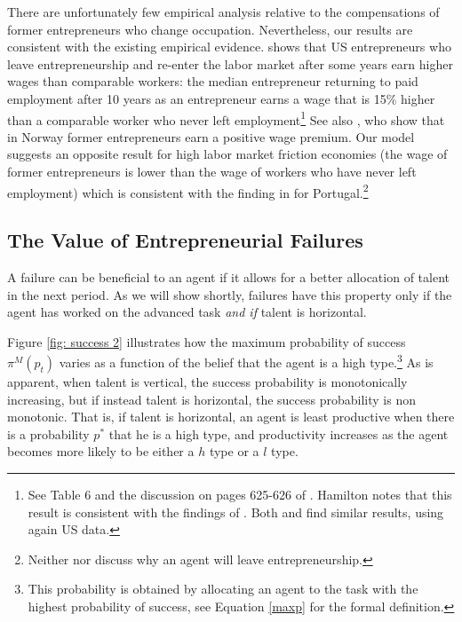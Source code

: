 \documentclass[12pt,american]{paper}
\theoremstyle{remark}
\begin{document}
There are unfortunately few empirical analysis relative to the compensations of former entrepreneurs who change occupation. Nevertheless, our results are consistent with the existing empirical evidence. \cite{hamilton2000does} shows that US entrepreneurs who leave entrepreneurship and re-enter the labor market after some years earn higher wages than comparable workers: the median entrepreneur returning to paid employment after 10 years as an entrepreneur earns a wage that is 15\% higher than a comparable worker who never left employment\footnote{See Table 6 and the discussion on pages 625-626 of \cite{hamilton2000does}. Hamilton notes that this result is consistent with the findings of \cite{evans1990}.  Both  \cite{daly2015long} and \cite{Hincapie2020} find similar results, using again US data.} See also \cite{luzzi2016individual}, who show that in Norway former entrepreneurs earn a positive wage premium.  Our model suggests an opposite result for high labor market friction economies (the wage of former entrepreneurs is lower than the wage of workers who have never left employment) which is consistent with the finding in \citet*{baptista2012former} for Portugal.\footnote{Neither \citet{hamilton2000does} nor \citet*{baptista2012former} discuss why an agent will leave entrepreneurship.}


\subsection{The Value of Entrepreneurial Failures}
A failure can be beneficial to an agent if it allows for a better allocation of talent in the next period. As we will show shortly, failures have this property only if the agent has worked on the advanced task  \textit{and if} talent is horizontal. 

 Figure \ref{fig: success 2} illustrates how the maximum probability of success $\pi^M(p_t)$  varies as a function of the belief that the agent is a high type.\footnote{This probability is obtained by allocating an agent to the task with the highest probability of success, see Equation \ref{maxp} for the formal definition.} As is apparent,  when talent is vertical, the success probability is monotonically increasing, but if instead talent is horizontal, the success probability is non monotonic. That is, if talent is horizontal, an agent is least productive when there is a probability $p^*$ that he is a high type, and productivity increases as the agent becomes more likely to be either a $h$ type or a $l$ type. 
\end{document}
